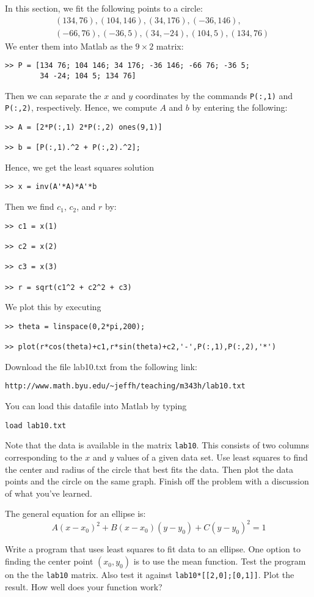 In this section, we fit the following points to a circle:
\begin{align*}
&(134,76),(104,146),(34,176),(-36,146),\\
&(-66,76),(-36,5),(34,-24),(104,5),(134,76)
\end{align*}
We enter them into Matlab as the $9\times 2$ matrix:
\begin{verbatim}
>> P = [134 76; 104 146; 34 176; -36 146; -66 76; -36 5; 
        34 -24; 104 5; 134 76]
\end{verbatim}
Then we can separate the $x$ and $y$ coordinates by the commands {\tt P(:,1)} and {\tt P(:,2)}, respectively.  Hence, we compute $A$ and $b$ by entering the following:
\begin{verbatim}
>> A = [2*P(:,1) 2*P(:,2) ones(9,1)]

>> b = [P(:,1).^2 + P(:,2).^2];
\end{verbatim}
Hence, we get the least squares solution
\begin{verbatim}
>> x = inv(A'*A)*A'*b
\end{verbatim}
Then we find $c_1$, $c_2$, and $r$ by:
\begin{verbatim}
>> c1 = x(1)

>> c2 = x(2)

>> c3 = x(3)

>> r = sqrt(c1^2 + c2^2 + c3)
\end{verbatim}
We plot this by executing
\begin{verbatim}
>> theta = linspace(0,2*pi,200);

>> plot(r*cos(theta)+c1,r*sin(theta)+c2,'-',P(:,1),P(:,2),'*')
\end{verbatim}

\begin{problem}
Download the file lab10.txt from the following link:
\begin{verbatim}
http://www.math.byu.edu/~jeffh/teaching/m343h/lab10.txt
\end{verbatim}
You can load this datafile into Matlab by typing
\begin{verbatim}
load lab10.txt
\end{verbatim}
Note that the data is available in the matrix {\tt lab10}.  This consists of two columns corresponding to the $x$ and $y$ values of a given data set.  Use least squares to find the center and radius of the circle that best fits the data.  Then plot the data points and the circle on the same graph.  Finish off the problem with a discussion of what you've learned.
\end{problem}

\begin{problem}
The general equation for an ellipse is:
\[
A(x-x_0)^2 + B(x-x_0)(y-y_0) + C(y-y_0)^2 = 1
\]

Write a program that uses least squares to fit data to an ellipse. One option to finding the center point $(x_0,y_0)$ is to use the mean function. Test the program on the the {\tt lab10} matrix. Also test it against {\tt lab10}\verb!*[[2,0];[0,1]]!. Plot the result. How well does your function work?
\end{problem}
